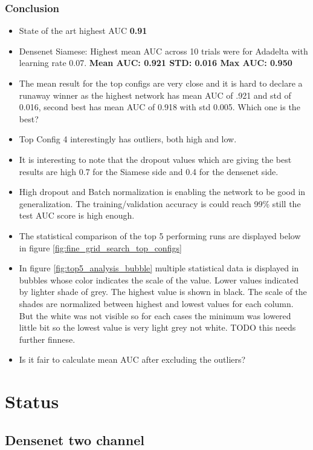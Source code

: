 \subsubsection{Conclusion}
\begin{itemize}
 \item State of the art highest AUC \textbf{0.91}
 \item Densenet Siamese: Highest mean AUC across 10 trials were for Adadelta with learning rate 0.07. \textbf{Mean AUC: 0.921 STD: 0.016 Max AUC: 0.950}
 \item The mean result for the top configs are very close and it is hard to declare a runaway winner as the highest network has mean AUC of .921 and std of 0.016, second best has mean AUC of 0.918 with std 0.005. 
 Which one is the best? 
 \item Top Config 4 interestingly has outliers, both high and low. 
 \item It is interesting to note that the dropout values which are giving the best results are high 0.7 for the Siamese side and 0.4 for the densenet side. 
 \item High dropout and Batch normalization is enabling the network to be good in generalization. The training/validation accuracy is could reach 99\% still the test AUC score is high enough.
 \item The statistical comparison of the top 5 performing runs are displayed below in figure \ref{fig:fine_grid_search_top_configs}
 \item In figure \ref{fig:top5_analysis_bubble} multiple statistical data is displayed in bubbles whose color indicates the scale of the value. Lower values indicated by lighter shade of grey. The highest value is shown 
 in black. The scale of the shades are normalized between highest and lowest values for each column. But the white was not visible so for each cases the minimum was lowered little bit so the lowest value is very light grey 
 not white. TODO this needs further finnese. 
 \item Is it fair to calculate mean AUC after excluding the outliers?
\end{itemize}

\section{Status}
\subsection{Densenet two channel}

